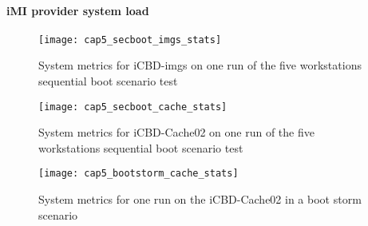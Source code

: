 \paragraph{iMI provider system load}
\label{par:eval_sys_load}

\begin{figure}[htbp]
	\centering
	\texttt{[image: cap5\_secboot\_imgs\_stats]}
	\caption{System metrics for iCBD-imgs on one run of the five workstations sequential boot scenario test}
	\label{fig:boot_imgs_stats}
\end{figure}


\begin{figure}[htbp]
	\centering
	\texttt{[image: cap5\_secboot\_cache\_stats]}
	\caption{System metrics for iCBD-Cache02 on one run of the five workstations sequential boot scenario test}
	\label{fig:boot_cache_stats}
\end{figure}


\begin{figure}[htbp]
	\centering
	\texttt{[image: cap5\_bootstorm\_cache\_stats]}
	\caption{System metrics for one run on the iCBD-Cache02 in a boot storm scenario}
	\label{fig:boot_cache_stats}
\end{figure}


